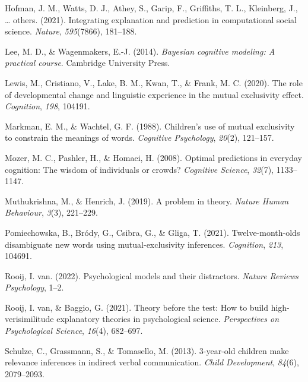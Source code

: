 \documentclass[
  man,floatsintext]{apa6}
\newlength{\cslhangindent}
\newlength{\cslentryspacingunit} %
\newenvironment{CSLReferences}[2] %
 {%
  \setlength{\parindent}{0pt}
  \ifodd #1
  \let\oldpar\par
  \def\par{\hangindent=\cslhangindent\oldpar}
  \fi
  \setlength{\parskip}{#2\cslentryspacingunit}
 }%
 {}
\begin{document}
\begin{CSLReferences}{1}{0}
\leavevmode{}%
Hofman, J. M., Watts, D. J., Athey, S., Garip, F., Griffiths, T. L., Kleinberg, J., \ldots{} others. (2021). Integrating explanation and prediction in computational social science. \emph{Nature}, \emph{595}(7866), 181--188.

\leavevmode{}%
Lee, M. D., \& Wagenmakers, E.-J. (2014). \emph{Bayesian cognitive modeling: A practical course}. Cambridge University Press.

\leavevmode{}%
Lewis, M., Cristiano, V., Lake, B. M., Kwan, T., \& Frank, M. C. (2020). The role of developmental change and linguistic experience in the mutual exclusivity effect. \emph{Cognition}, \emph{198}, 104191.

\leavevmode{}%
Markman, E. M., \& Wachtel, G. F. (1988). Children's use of mutual exclusivity to constrain the meanings of words. \emph{Cognitive Psychology}, \emph{20}(2), 121--157.

\leavevmode{}%
Mozer, M. C., Pashler, H., \& Homaei, H. (2008). Optimal predictions in everyday cognition: The wisdom of individuals or crowds? \emph{Cognitive Science}, \emph{32}(7), 1133--1147.

\leavevmode{}%
Muthukrishna, M., \& Henrich, J. (2019). A problem in theory. \emph{Nature Human Behaviour}, \emph{3}(3), 221--229.

\leavevmode{}%
Pomiechowska, B., Bródy, G., Csibra, G., \& Gliga, T. (2021). Twelve-month-olds disambiguate new words using mutual-exclusivity inferences. \emph{Cognition}, \emph{213}, 104691.

\leavevmode{}%
Rooij, I. van. (2022). Psychological models and their distractors. \emph{Nature Reviews Psychology}, 1--2.

\leavevmode{}%
Rooij, I. van, \& Baggio, G. (2021). Theory before the test: How to build high-verisimilitude explanatory theories in psychological science. \emph{Perspectives on Psychological Science}, \emph{16}(4), 682--697.

\leavevmode{}%
Schulze, C., Grassmann, S., \& Tomasello, M. (2013). 3-year-old children make relevance inferences in indirect verbal communication. \emph{Child Development}, \emph{84}(6), 2079--2093.


\end{CSLReferences}
\end{document}
